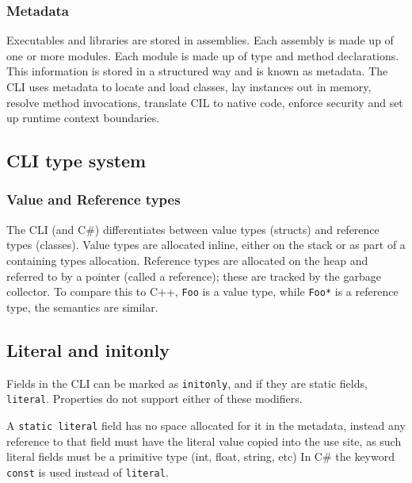 \documentclass[english]{report}
\begin{document}
\subsubsection{Metadata}

Executables and libraries are stored in assemblies. Each assembly is made up of
one or more modules. Each module is made up of type and method declarations.
This information is stored in a structured way and is known as metadata. The
CLI uses metadata to locate and load classes, lay instances out in memory,
resolve method invocations, translate CIL to native code, enforce security and
set up runtime context boundaries.


\subsection{CLI type system}

\label{sec:cli_type_system}



\subsubsection{Value and Reference types}

The CLI (and C\#) differentiates between value types (structs) and
reference types (classes). Value types are allocated inline, either
on the stack or as part of a containing types allocation. Reference
types are allocated on the heap and referred to by a pointer (called
a reference); these are tracked by the garbage collector. To compare
this to C++, \texttt{Foo} is a value type, while \texttt{Foo{*}} is
a reference type, the semantics are similar.


\subsection{Literal and initonly\label{sub:Literal-and-initonly}}

Fields in the CLI can be marked as \texttt{initonly}, and if they are static
fields, \texttt{literal}. Properties do not support either of these modifiers.

A \texttt{static literal} field has no space allocated for it in the metadata,
instead any reference to that field must have the literal value copied into the
use site, as such literal fields must be a primitive type (int, float, string,
etc) In C\# the keyword \texttt{const} is used instead of \texttt{literal}.
\end{document}
